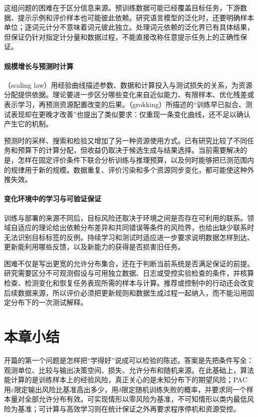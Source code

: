 这组问题的困难在于区分信息来源。预训练数据可能已经覆盖目标任务，下游数据、提示示例和评价样本也可能彼此依赖。研究语言模型的泛化时，还要明确样本单位；逐词元计分不意味着词元彼此独立。处理词元依赖的泛化界已有具体结果，但保证仍针对指定计分量和数据过程，不能直接改称任意提示任务上的正确性保证。

\paragraph{规模增长与预测时计算}
（scaling law）用经验曲线描述参数、数据和计算投入与测试损失的关系，为资源分配提供依据。理论要进一步区分哪些变化来自近似能力、有限样本、优化残差或表示学习，再预测资源配置改变的后果。（grokking）所描述的“训练早已拟合、测试表现却在更晚才改善”也提出了类似要求：仅重现一条变化曲线，还不足以确认产生它的机制。

预测时的采样、搜索和检验又增加了另一种资源使用方式。已有研究比较了不同任务和预算下的计算分配，但收益仍取决于候选生成与结果选择。当前需要解决的是，怎样在固定评价条件下联合分析训练与推理预算，以及何时能够把已测范围内的规律用于新的规模。数据重复、评价污染和多个资源同步变化，都可能使这种外推失效。

\paragraph{变化环境中的学习与可验证保证}
训练与部署的来源不同后，目标风险还取决于环境之间是否存在可利用的联系。领域自适应的理论给出依赖分布差异和共同错误等条件的风险界，也给出缺少联系时无法识别目标标签的反例。持续学习和测试时适应进一步要求说明数据怎样到达、更新能利用哪些反馈，以及新能力的获得是否损害旧任务。

困难不仅是写出更宽的允许分布集合，还在于判断当前系统是否满足保证的前提。研究需要区分不可观测假设与可用独立数据、日志或受控实验检查的条件，并核算检查、检测变化和恢复任务表现所需的样本与计算。推荐或控制中的行动还会改变后续数据来源，所以评价必须把更新规则和数据生成过程一起纳入，而不能沿用固定分布下的一次测试解释。


\section{本章小结}
\label{sec:statistical-framework-summary}

开篇的第一个问题是怎样把“学得好”说成可以检验的陈述。答案是先把条件写全：观测单位、比较与输出决策空间、损失、允许分布和随机来源。在此基础上，算法能计算的是训练样本上的经验风险，真正关心的是未知分布下的期望风险；PAC用$\varepsilon$限定输出风险比基准高出多少，用$\delta$限定随机训练失败的概率，并要求同一个样本量对全部允许分布有效。可实现情形以零风险为基准，不可知情形以类内最低风险为基准；可计算与高效学习则在统计保证之外再要求程序停机和资源受控。

